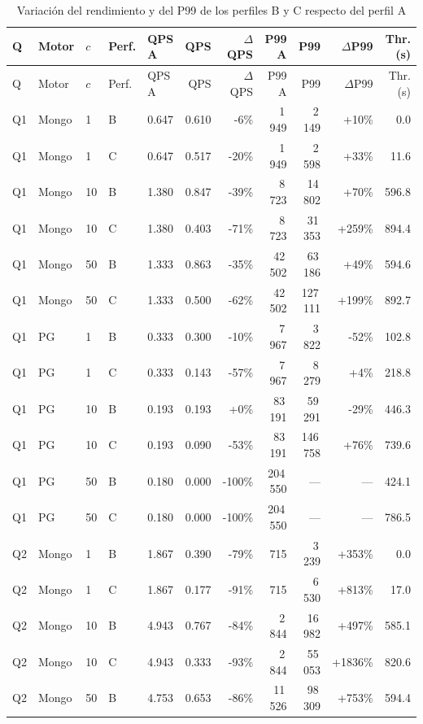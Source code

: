\begin{longtable}{@{}lllllrrrrrr@{}}
\caption{Variación del rendimiento y del P99 de los perfiles B y C respecto del perfil A}\label{tab:m1}\\
\toprule
Q & Motor & $c$ & Perf. & QPS A & QPS & $\Delta$QPS & P99 A & P99 & $\Delta$P99 & Thr. (s) \\
\midrule\endfirsthead
\toprule
Q & Motor & $c$ & Perf. & QPS A & QPS & $\Delta$QPS & P99 A & P99 & $\Delta$P99 & Thr. (s) \\
\midrule\endhead
\bottomrule\endlastfoot
Q1 & Mongo & 1 & B & 0.647 & 0.610 & -6\% & 1\,949 & 2\,149 & +10\% & 0.0 \\
Q1 & Mongo & 1 & C & 0.647 & 0.517 & -20\% & 1\,949 & 2\,598 & +33\% & 11.6 \\
Q1 & Mongo & 10 & B & 1.380 & 0.847 & -39\% & 8\,723 & 14\,802 & +70\% & 596.8 \\
Q1 & Mongo & 10 & C & 1.380 & 0.403 & -71\% & 8\,723 & 31\,353 & +259\% & 894.4 \\
Q1 & Mongo & 50 & B & 1.333 & 0.863 & -35\% & 42\,502 & 63\,186 & +49\% & 594.6 \\
Q1 & Mongo & 50 & C & 1.333 & 0.500 & -62\% & 42\,502 & 127\,111 & +199\% & 892.7 \\
Q1 & PG & 1 & B & 0.333 & 0.300 & -10\% & 7\,967 & 3\,822 & -52\% & 102.8 \\
Q1 & PG & 1 & C & 0.333 & 0.143 & -57\% & 7\,967 & 8\,279 & +4\% & 218.8 \\
Q1 & PG & 10 & B & 0.193 & 0.193 & +0\% & 83\,191 & 59\,291 & -29\% & 446.3 \\
Q1 & PG & 10 & C & 0.193 & 0.090 & -53\% & 83\,191 & 146\,758 & +76\% & 739.6 \\
Q1 & PG & 50 & B & 0.180 & 0.000 & -100\% & 204\,550 & --- & --- & 424.1 \\
Q1 & PG & 50 & C & 0.180 & 0.000 & -100\% & 204\,550 & --- & --- & 786.5 \\
\addlinespace[2pt]
Q2 & Mongo & 1 & B & 1.867 & 0.390 & -79\% & 715 & 3\,239 & +353\% & 0.0 \\
Q2 & Mongo & 1 & C & 1.867 & 0.177 & -91\% & 715 & 6\,530 & +813\% & 17.0 \\
Q2 & Mongo & 10 & B & 4.943 & 0.767 & -84\% & 2\,844 & 16\,982 & +497\% & 585.1 \\
Q2 & Mongo & 10 & C & 4.943 & 0.333 & -93\% & 2\,844 & 55\,053 & +1836\% & 820.6 \\
Q2 & Mongo & 50 & B & 4.753 & 0.653 & -86\% & 11\,526 & 98\,309 & +753\% & 594.4 \\

\end{longtable}
